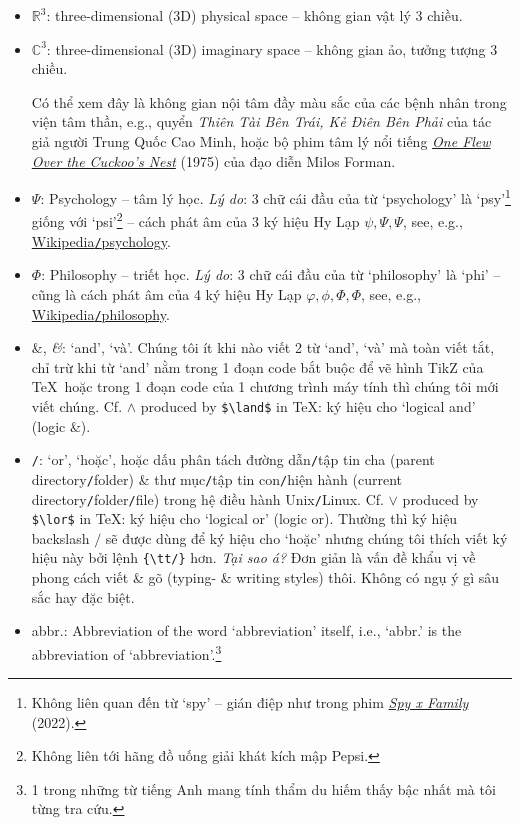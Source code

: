 \documentclass[12pt,oneside]{book}
\begin{document}
\begin{itemize}
	\item $\mathbb{R}^3$: three-dimensional (3D) physical space -- không gian vật lý 3 chiều.
	\item $\mathbb{C}^3$: three-dimensional (3D) imaginary space -- không gian ảo, tưởng tượng 3 chiều.
	
	Có thể xem đây là không gian nội tâm đầy màu sắc của các bệnh nhân trong viện tâm thần, e.g., quyển {\it Thiên Tài Bên Trái, Kẻ Điên Bên Phải} của tác giả người Trung Quốc {\sc Cao Minh}, hoặc bộ phim tâm lý nổi tiếng \href{https://www.imdb.com/title/tt0073486}{\it One Flew Over the Cuckoo's Nest} (1975) của đạo diễn {\sc Milos Forman}.
	\item $\Psi$: Psychology -- tâm lý học. {\it Lý do}: 3 chữ cái đầu của từ `psychology' là `psy'\footnote{Không liên quan đến từ `spy' -- gián điệp như trong phim \href{https://www.imdb.com/title/tt13706018}{\it Spy x Family} (2022).} giống với `psi'\footnote{Không liên tới hãng đồ uống giải khát kích mập Pepsi.} -- cách phát âm của 3 ký hiệu Hy Lạp $\psi,\Psi,\varPsi$, see, e.g., \href{https://en.wikipedia.org/wiki/Psychology}{Wikipedia{\tt/}psychology}.
	\item $\Phi$: Philosophy -- triết học. {\it Lý do}: 3 chữ cái đầu của từ `philosophy' là `phi' -- cũng là cách phát âm của 4 ký hiệu Hy Lạp $\varphi,\phi,\Phi,\varPhi$, see, e.g., \href{https://en.wikipedia.org/wiki/Philosophy}{Wikipedia{\tt/}philosophy}.
	\item \&, {\it\&}: `and', `và'. Chúng tôi ít khi nào viết 2 từ `and', `và' mà toàn viết tắt, chỉ trừ khi từ `and' nằm trong 1 đoạn code bắt buộc để vẽ hình TikZ của \TeX\ hoặc trong 1 đoạn code của 1 chương trình máy tính thì chúng tôi mới viết chúng. Cf. $\land$ produced by \verb|$\land$| in \TeX: ký hiệu cho `logical and' (logic \&).
	\item {\tt/}: `or', `hoặc', hoặc dấu phân tách đường dẫn{\tt/}tập tin cha (parent directory{\tt/}folder) \& thư mục{\tt/}tập tin con{\tt/}hiện hành (current directory{\tt/}folder{\tt/}file) trong hệ điều hành Unix{\tt/}Linux. Cf. $\lor$ produced by \verb|$\lor$| in \TeX: ký hiệu cho `logical or' (logic or). Thường thì ký hiệu backslash $/$ sẽ được dùng để ký hiệu cho `hoặc' nhưng chúng tôi thích viết ký hiệu này bởi lệnh \verb|{\tt/}| hơn. {\it Tại sao á?} Đơn giản là vấn đề khẩu vị về phong cách viết \& gõ (typing- \& writing styles) thôi. Không có ngụ ý gì sâu sắc hay đặc biệt.
	\item abbr.: Abbreviation of the word `abbreviation' itself, i.e., `abbr.' is the abbreviation of `abbreviation'.\footnote{1 trong những từ tiếng Anh mang tính thẩm du hiếm thấy bậc nhất mà tôi từng tra cứu.}

\end{itemize}
\end{document}
